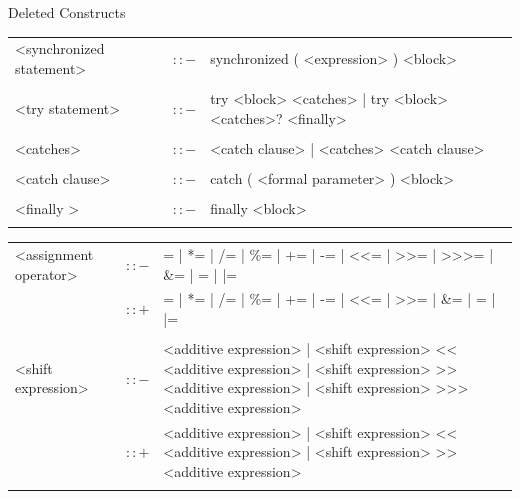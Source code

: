 \documentclass[landscape, 11pt]{article}
\begin{document}
\begin{qsection}{Deleted Constructs}
\begin{enumerate}[label=\bt{\theenumi.}]
\begin{longtable}{R{7cm} c L{15cm}}
				<synchronized statement>					&	$\colon\colon-$	&	synchronized ( <expression> ) <block> \\\\
				<try statement>								&	$\colon\colon-$	&	try <block> <catches> | try <block> <catches>? <finally> \\\\
				<catches>									&	$\colon\colon-$	&	<catch clause> | <catches> <catch clause> \\\\
				<catch clause>								&	$\colon\colon-$	&	catch ( <formal parameter> ) <block> \\\\
				<finally >									&	$\colon\colon-$	&	finally <block> \\\\
			\end{longtable}

		\ditem[Expressions.]
			\begin{longtable}{R{7cm} c L{15cm}}
				<assignment operator>						&	$\colon\colon-$	&	= | *= | /= | \%= | += | -= | <<= | >>= | >>>= | \&= | \wedge= | |= \\
															&	$\colon\colon+$	&	= | *= | /= | \%= | += | -= | <<= | >>= | \&= | \wedge= | |= \\\\
				<shift expression>							&	$\colon\colon-$	&	<additive expression> | <shift expression> << <additive expression> | <shift expression> >> <additive expression> | <shift expression> >>> <additive expression> \\
															&	$\colon\colon+$	&	<additive expression> | <shift expression> << <additive expression> | <shift expression> >> <additive expression> \\\\
			\end{longtable}


\end{enumerate}
\end{qsection}
\end{document}
